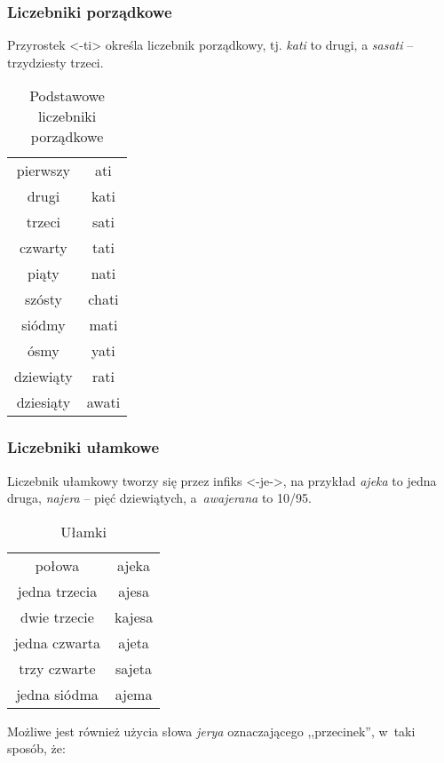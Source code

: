 \begin{spacing}{1.1}
\subsubsection{Liczebniki porządkowe}

Przyrostek <-ti> określa liczebnik porządkowy, tj. \emph{kati} to drugi, a
\emph{sasati} -- trzydziesty trzeci.

\begin{table}[ht]
\centering
\caption{Podstawowe liczebniki porządkowe}
\begin{tabular}{cc} \toprule
	pierwszy & ati \\
	drugi & kati \\
	trzeci & sati \\
	czwarty & tati \\
	piąty & nati \\
	szósty & chati \\
	siódmy & mati \\
	ósmy & yati \\
	dziewiąty & rati \\
	dziesiąty & awati \\\bottomrule
\end{tabular}
\label{tab:numerals3}
\end{table}

\subsubsection{Liczebniki ułamkowe}

Liczebnik ułamkowy tworzy się przez infiks <-je->, na przykład \emph{ajeka} to
jedna druga, \emph{najera} -- pięć dziewiątych, a~\emph{awajerana} to 10/95.

\begin{table}[ht]
	\centering
	\caption{Ułamki}
	\begin{tabular}{cc} \toprule
		połowa & ajeka \\
		jedna trzecia & ajesa \\
		dwie trzecie & kajesa \\
		jedna czwarta & ajeta \\
		trzy czwarte & sajeta \\
		jedna siódma & ajema  \\\bottomrule
	\end{tabular}
	\label{tab:numerals4}
\end{table}

Możliwe jest również użycia słowa \emph{jerya} oznaczającego ,,przecinek'',
w~taki sposób, że:


\end{spacing}
